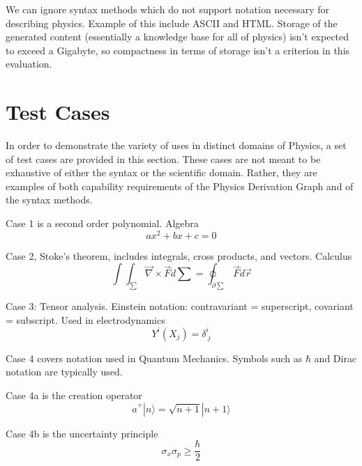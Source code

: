 \documentclass{article}
\begin{document}
\begin{multicols}{2}
We can ignore syntax methods which do not support notation necessary for describing physics. Example of this include ASCII\cite{1968_ASCII} and HTML\cite{1999_HTML}. Storage of the generated content (essentially a knowledge base for all of physics) isn't expected to exceed a Gigabyte, so compactness in terms of storage isn't a criterion in this evaluation.

\section{Test Cases\label{sec:test_cases}}
In order to demonstrate the variety of uses in distinct domains of Physics, a set of test cases are provided in this section. These cases are not meant to be exhaustive of either the syntax or the scientific domain. Rather, they are examples of both capability requirements of the Physics Derivation Graph and of the syntax methods. 


Case 1 is a second order polynomial. Algebra
\begin{equation}
a x^2 + b x + c = 0
\label{eq:polynomial_case1_body}
\end{equation}

Case 2, Stoke's theorem, includes integrals, cross products, and vectors. Calculus
\begin{equation}
\int \int_{\sum} \vec{\nabla} \times \vec{F} \dot d\sum = \oint_{\partial \sum} \vec{F}\dot d\vec{r}
\label{eq:stokes_case2_body}
\end{equation}

Case 3: Tensor analysis. Einstein notation: contravariant = superscript, covariant = subscript. Used in electrodynamics
\begin{equation}
Y^i(X_j) = \delta^i_{\ j}
\label{eq:tensor_analysis_case3_body}
\end{equation}

Case 4 covers notation used in Quantum Mechanics. Symbols such as $\hbar$ and Dirac notation are typically used.

Case 4a is the creation operator 
\begin{equation}
\hat{a}^+ |n\rangle = \sqrt{n+1} |n+1\rangle
\label{eq:creation_operator_case4a_body}
\end{equation}

Case 4b is the uncertainty principle
\begin{equation}
\sigma_x \sigma_p \geq \frac{\hbar}{2}
\label{eq:uncertainty_principle_case4b_body}
\end{equation}


\end{multicols}
\end{document}
